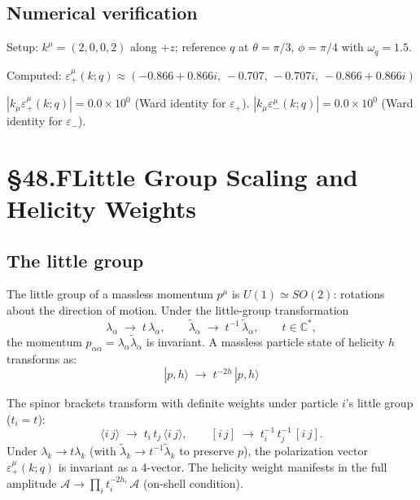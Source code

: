 \documentclass[12pt]{article}
\newcommand{\verified}[1]{\textcolor{verifygreen}{\checkmark\; #1}}
\begin{document}
\subsection{Numerical verification}

Setup: $k^\mu=(2,0,0,2)$ along $+z$;
reference $q$ at $\theta=\pi/3$, $\phi=\pi/4$ with $\omega_q=1.5$.

Computed: $\varepsilon_+^\mu(k;q) \approx (-0.866+0.866i,\,-0.707,\,-0.707i,\,-0.866+0.866i)$

\verified{$|k_\mu\varepsilon_+^\mu(k;q)| = 0.0\times10^0$ (Ward identity for $\varepsilon_+$).}
\verified{$|k_\mu\varepsilon_-^\mu(k;q)| = 0.0\times10^0$ (Ward identity for $\varepsilon_-$).}

\section{§48.F\quad Little Group Scaling and Helicity Weights}

\subsection{The little group}

The little group of a massless momentum $p^\mu$ is $U(1)\simeq SO(2)$:
rotations about the direction of motion.  Under the little-group transformation
\begin{equation}
  \lambda_\alpha \;\to\; t\,\lambda_\alpha,
  \qquad
  \tilde\lambda_{\dot\alpha} \;\to\; t^{-1}\,\tilde\lambda_{\dot\alpha},
  \qquad t\in\mathbb{C}^*,
  \tag{48.15}
\end{equation}
the momentum $p_{\alpha\dot\alpha}=\lambda_\alpha\tilde\lambda_{\dot\alpha}$ is
invariant.  A massless particle state of helicity $h$ transforms as:
\begin{equation}
  |p,h\rangle \;\to\; t^{-2h}\,|p,h\rangle
  \tag{48.16}
\end{equation}

The spinor brackets transform with definite weights under particle $i$'s little group ($t_i=t$):
\begin{equation}
  \langle i\,j\rangle \;\to\; t_i\,t_j\,\langle i\,j\rangle,
  \qquad
  [i\,j] \;\to\; t_i^{-1}\,t_j^{-1}\,[i\,j].
  \tag{48.17}
\end{equation}
Under $\lambda_k\to t\lambda_k$ (with $\tilde\lambda_k\to t^{-1}\tilde\lambda_k$ to
preserve $p$), the polarization vector $\varepsilon_+^\mu(k;q)$ is invariant as a
4-vector.  The helicity weight manifests in the full amplitude
$\mathcal{A} \to \prod_i t_i^{-2h_i}\,\mathcal{A}$ (on-shell condition).
\end{document}
